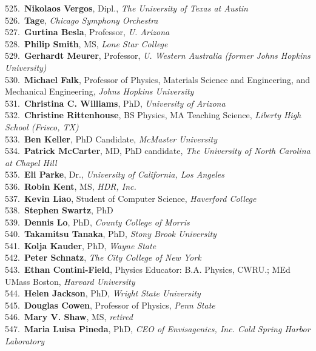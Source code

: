 525.~{\bf Nikolaos Vergos}, Dipl., {\sl The University of Texas at Austin} \\
526.~{\bf Tage}, {\sl Chicago Symphony Orchestra} \\
527.~{\bf Gurtina Besla}, Professor, {\sl U. Arizona} \\
528.~{\bf Philip Smith}, MS, {\sl Lone Star College} \\
529.~{\bf Gerhardt Meurer}, Professor, {\sl U. Western Australia (former Johns Hopkins University)} \\
530.~{\bf Michael Falk}, Professor of Physics, Materials Science and Engineering, and Mechanical Engineering, {\sl Johns Hopkins University } \\
531.~{\bf Christina C. Williams}, PhD, {\sl University of Arizona} \\
532.~{\bf Christine Rittenhouse}, BS Physics, MA Teaching Science, {\sl Liberty High School (Frisco, TX)} \\
533.~{\bf Ben Keller}, PhD Candidate, {\sl McMaster University} \\
534.~{\bf Patrick McCarter}, MD, PhD candidate, {\sl The University of North Carolina at Chapel Hill} \\
535.~{\bf Eli Parke}, Dr., {\sl University of California, Los Angeles} \\
536.~{\bf Robin Kent}, MS, {\sl HDR, Inc.} \\
537.~{\bf Kevin Liao}, Student of Computer Science, {\sl Haverford College} \\
538.~{\bf Stephen Swartz}, PhD \\
539.~{\bf Dennis Lo}, PhD, {\sl County College of Morris} \\
540.~{\bf Takamitsu Tanaka}, PhD, {\sl Stony Brook University} \\
541.~{\bf Kolja Kauder}, PhD, {\sl Wayne State} \\
542.~{\bf Peter Schnatz}, {\sl The City College of New York} \\
543.~{\bf Ethan Contini-Field}, Physics Educator: B.A. Physics, CWRU.; MEd UMass Boston, {\sl Harvard University} \\
544.~{\bf Helen Jackson}, PhD, {\sl Wright State University } \\
545.~{\bf Douglas Cowen}, Professor of Physics, {\sl Penn State} \\
546.~{\bf Mary V. Shaw}, MS, {\sl retired} \\
547.~{\bf Maria Luisa Pineda}, PhD, {\sl CEO of Envisagenics, Inc. Cold Spring Harbor Laboratory } \\
